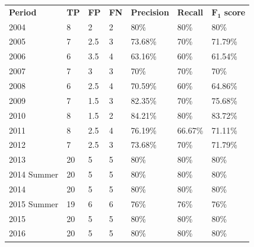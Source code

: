 \documentclass[10pt]{article}
\theoremstyle{definition}
\theoremstyle{remark}
\begin{document}
\begin{table}[!ht]
    \centering
\begin{tabular}{lllllll}
    \textbf{Period} & \textbf{TP} & \textbf{FP} & \textbf{FN} & \textbf{Precision} & \textbf{Recall} & $\mathbf{F_1}$ \textbf{score} \\
    2004            & 8           & 2           & 2           & 80\%               & 80\%            & 80\%    \\
    2005            & 7           & 2.5         & 3           & 73.68\%            & 70\%            & 71.79\% \\
    2006            & 6           & 3.5         & 4           & 63.16\%            & 60\%            & 61.54\% \\
    2007            & 7           & 3           & 3           & 70\%               & 70\%            & 70\%    \\
    2008            & 6           & 2.5         & 4           & 70.59\%            & 60\%            & 64.86\% \\
    2009            & 7           & 1.5         & 3           & 82.35\%            & 70\%            & 75.68\% \\
    2010            & 8           & 1.5         & 2           & 84.21\%            & 80\%            & 83.72\% \\
    2011            & 8           & 2.5         & 4           & 76.19\%            & 66.67\%         & 71.11\% \\
    2012            & 7           & 2.5         & 3           & 73.68\%            & 70\%            & 71.79\% \\
    2013            & 20          & 5           & 5           & 80\%               & 80\%            & 80\%    \\
    2014 Summer     & 20          & 5           & 5           & 80\%               & 80\%            & 80\%    \\
    2014            & 20          & 5           & 5           & 80\%               & 80\%            & 80\%    \\
    2015 Summer     & 19          & 6           & 6           & 76\%               & 76\%            & 76\%    \\
    2015            & 20          & 5           & 5           & 80\%               & 80\%            & 80\%    \\
    2016            & 20          & 5           & 5           & 80\%               & 80\%            & 80\%    \\
\end{tabular}
\end{table}
\end{document}
